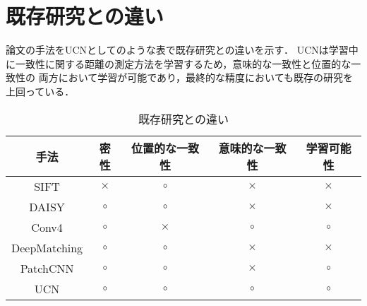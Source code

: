 \section{既存研究との違い}

論文の手法をUCNとしてのような表で既存研究との違いを示す．
UCNは学習中に一致性に関する距離の測定方法を学習するため，意味的な一致性と位置的な一致性の
両方において学習が可能であり，最終的な精度においても既存の研究を上回っている．

\begin{table}[htbp]
  \centering
  \caption{既存研究との違い}
  \label{table:difference_previous}
  \begin{tabular}{c|c|c|c|c}
    手法 & 密性 & 位置的な一致性 & 意味的な一致性 & 学習可能性 \\ \hline
    SIFT \cite{SIFT} & $\times$ & $\circ$  & $\times$ & $\times$ \\
    DAISY \cite{DAISY} & $\circ$  & $\circ$  & $\times$ & $\times$ \\
    Conv4 \cite{Conv4} & $\circ$  & $\times$ & $\circ$  & $\circ$  \\
    DeepMatching \cite{DeepMatching} & $\circ$  & $\circ$  & $\times$ & $\times$ \\
    PatchCNN \cite{PatchCNN} & $\circ$  & $\circ$  & $\times$ & $\circ$ \\
    UCN \cite{choy_nips16} & $\circ$  & $\circ$  & $\circ$  & $\circ$
  \end{tabular}
\end{table}
